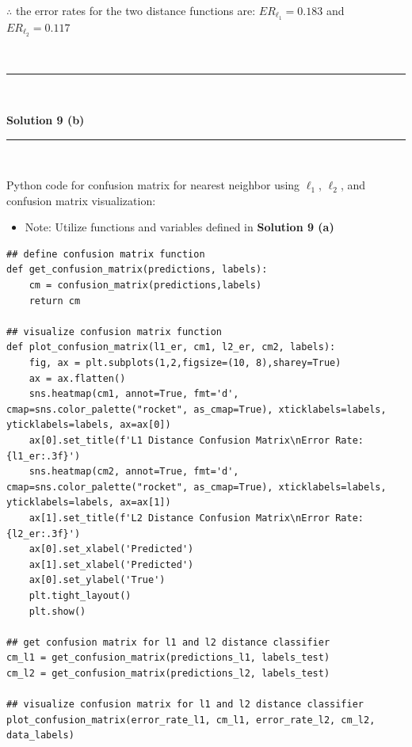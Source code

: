 \documentclass{article}
\begin{document}
\parbox{\textwidth}{$\therefore$ the error rates for the two distance functions are: $ER_{\ell_1} = 0.183$ and $ER_{\ell_2} = 0.117$}\\

\noindent\rule{\textwidth}{0.4pt}\\

\newpage

\textbf{Solution 9 (b)}

\noindent\rule{\textwidth}{0.4pt}\\

\parbox{\textwidth}{Python code for confusion matrix for nearest neighbor using $\ell_1$, $\ell_2$, and confusion matrix visualization:}

\begin{itemize}
  \item \parbox{\textwidth}{Note: Utilize functions and variables defined in \textbf{Solution 9 (a)}}
\end{itemize}

\begin{center}

\begin{lstlisting}
## define confusion matrix function
def get_confusion_matrix(predictions, labels):
    cm = confusion_matrix(predictions,labels)
    return cm
  
## visualize confusion matrix function
def plot_confusion_matrix(l1_er, cm1, l2_er, cm2, labels):
    fig, ax = plt.subplots(1,2,figsize=(10, 8),sharey=True)
    ax = ax.flatten()
    sns.heatmap(cm1, annot=True, fmt='d', cmap=sns.color_palette("rocket", as_cmap=True), xticklabels=labels, yticklabels=labels, ax=ax[0])
    ax[0].set_title(f'L1 Distance Confusion Matrix\nError Rate: {l1_er:.3f}')
    sns.heatmap(cm2, annot=True, fmt='d', cmap=sns.color_palette("rocket", as_cmap=True), xticklabels=labels, yticklabels=labels, ax=ax[1])
    ax[1].set_title(f'L2 Distance Confusion Matrix\nError Rate: {l2_er:.3f}')
    ax[0].set_xlabel('Predicted')
    ax[1].set_xlabel('Predicted')
    ax[0].set_ylabel('True')
    plt.tight_layout()
    plt.show()

## get confusion matrix for l1 and l2 distance classifier
cm_l1 = get_confusion_matrix(predictions_l1, labels_test)
cm_l2 = get_confusion_matrix(predictions_l2, labels_test)

## visualize confusion matrix for l1 and l2 distance classifier
plot_confusion_matrix(error_rate_l1, cm_l1, error_rate_l2, cm_l2, data_labels)
\end{lstlisting}
    
\end{center}
\end{document}
